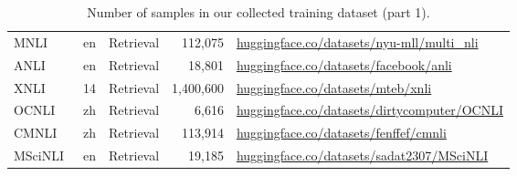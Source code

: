 \begin{table}[th]
{\begin{tabular}{lccrm{9cm}}
MNLI~\citep{2018MNLI} & en & Retrieval & 112,075 & \url{huggingface.co/datasets/nyu-mll/multi_nli} \\
ANLI~\citep{2020ANLI} & en & Retrieval & 18,801 & \url{huggingface.co/datasets/facebook/anli} \\
XNLI~\citep{2018XNLI} & 14 & Retrieval & 1,400,600 & \url{huggingface.co/datasets/mteb/xnli} \\
OCNLI~\citep{2020OCNLI} & zh & Retrieval & 6,616 & \url{huggingface.co/datasets/dirtycomputer/OCNLI} \\
CMNLI~\citep{2024cmnli} & zh & Retrieval & 113,914 & \url{huggingface.co/datasets/fenffef/cmnli} \\
MSciNLI~\citep{2024MSciNLI} & en & Retrieval & 19,185 & \url{huggingface.co/datasets/sadat2307/MSciNLI} \\
    \bottomrule
    \end{tabular}
    }
    \caption{Number of samples in our collected training dataset (part 1).}
    \label{tab:data-1}
\end{table}


